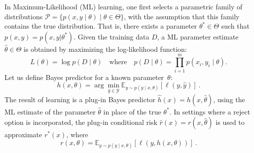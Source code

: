 In Maximum-Likelihood (ML) learning, one first selects a parametric family of distributions $\mathcal{P} = \{ p(x, y \mid \theta) \mid \theta \in \Theta \}$, with the assumption that this family contains the true distribution. That is, there exists a parameter $\theta^* \in \Theta$ such that
$p(x, y) = p(x, y | \theta^*)$. Given the training data $D$, a ML parameter estimate $\hat{\theta} \in \Theta$ is obtained by maximizing the log-likelihood function:
$$
L(\theta) = \log p(D \mid \theta)\quad\text{where}\quad p(D\mid \theta) = \prod_{i=1}^m p(x_i, y_i \mid \theta).
$$
%
Let us define Bayes predictor for a known parameter~$\theta$:
\begin{equation}
    \label{equ:PluginBayesPredictor}
h(x, \theta) = \arg\min_{\hat{y} \in \mathcal{Y}} \mathbb{E}_{y \sim p(y \mid x, \theta)} \left[ \ell(y, \hat{y}) \right]\:.
\end{equation}
%
The result of learning is a plug-in Bayes predictor $\hat{h}(x) = h(x, \hat{\theta})$, using the ML estimate of the parameter $\hat{\theta}$ in place of the true $\theta^*$.
%
In settings where a reject option is incorporated, the plug-in conditional risk 
$\hat{r}(x) = r(x, \hat{\theta})$ is used to approximate $r^*(x)$, where
\begin{equation}
\label{equ:plugingCondRisk}
r(x, \theta) = \mathbb{E}_{y \sim p(y \mid x, \theta)} \left[ \ell(y, h(x, \theta)) \right]\:.
\end{equation}



